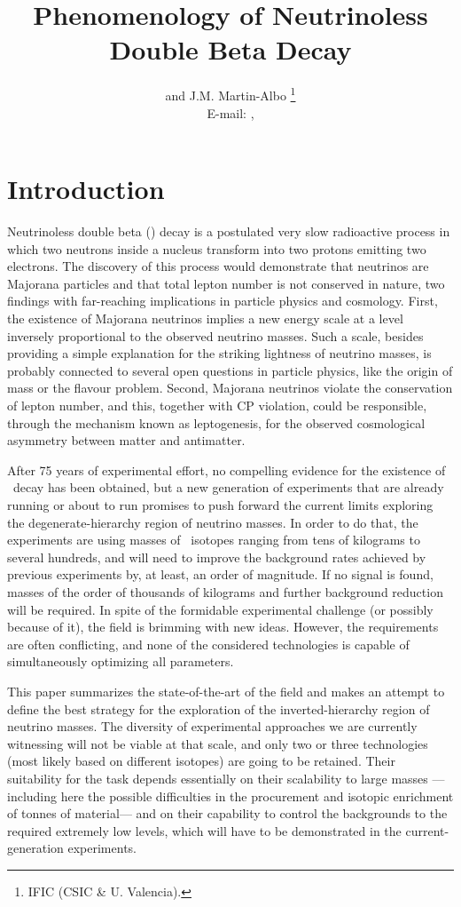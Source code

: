 \documentclass{PoS}
\title{Phenomenology of Neutrinoless Double Beta Decay}
\author{\speaker{J.J. Gomez-Cadenas} and J.M. Martin-Albo \thanks{IFIC (CSIC \& U. Valencia).}\\
        E-mail: \email{gomez@mail.cern.ch}, \email{jmalbos@ific.uv.es}}
\begin{document}
\section{Introduction}
Neutrinoless double beta (\bbonu) decay is a postulated very slow radioactive process in which two neutrons inside a nucleus transform into two protons emitting two electrons. The discovery of this process would demonstrate that neutrinos are Majorana particles and that total lepton number is not conserved in nature, two findings with far-reaching implications in particle physics and cosmology. First, the existence of Majorana neutrinos implies a new energy scale at a level inversely proportional to the observed neutrino masses. Such a scale, besides providing a simple explanation for the striking lightness of neutrino masses, is probably connected to several open questions in particle physics, like the origin of mass or the flavour problem. Second, Majorana neutrinos violate the conservation of lepton number, and this, together with CP violation, could be responsible, through the mechanism known as leptogenesis, for the observed cosmological asymmetry between matter and antimatter. 

After 75 years of experimental effort, no compelling evidence for the existence of \bbonu\ decay has been obtained, but a new generation of experiments that are already running or about to run promises to push forward the current limits exploring the degenerate-hierarchy region of neutrino masses. In order to do that, the experiments are using masses of \bbonu\ isotopes ranging from tens of kilograms to several hundreds, and will need to improve the background rates achieved by previous experiments by, at least, an order of magnitude. If no signal is found, masses of the order of thousands of kilograms and further background reduction will be required. In spite of the formidable experimental challenge (or possibly because of it), the field is brimming with new ideas. However, the requirements are often conflicting, and none of the considered technologies is capable of simultaneously optimizing all parameters. 

This paper summarizes the state-of-the-art of the field and makes an attempt to define the best strategy for the exploration of the inverted-hierarchy region of neutrino masses. The diversity of experimental approaches we are currently witnessing will not be viable at that scale, and only two or three technologies (most likely based on different isotopes) are going to be retained. Their suitability for the task depends essentially on their scalability to large masses --- including here the possible difficulties in the procurement and isotopic enrichment of tonnes of material--- and on their capability to control the backgrounds to the required extremely low levels, which will have to be demonstrated in the current-generation experiments.
\end{document}
